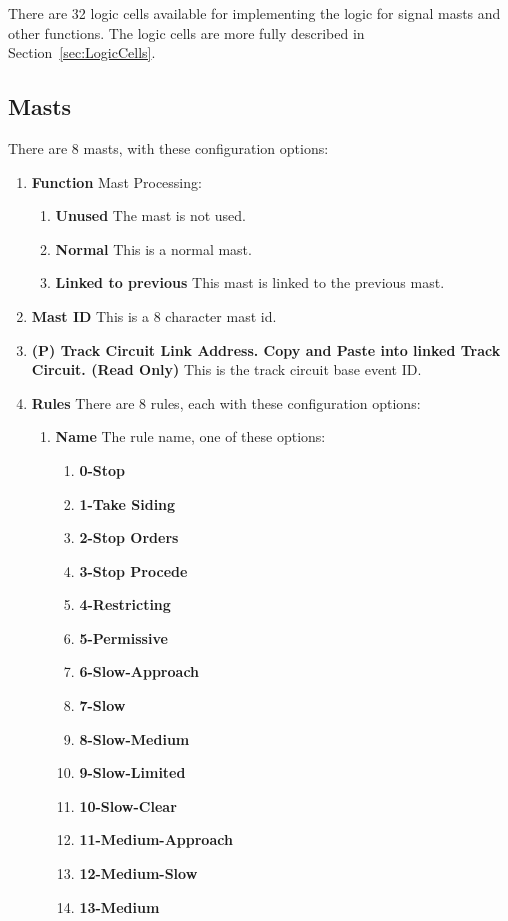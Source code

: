 There are 32 logic cells available for implementing the logic for signal masts 
and other functions.  The logic cells are more fully described in 
Section~\ref{sec:LogicCells}.

\subsection{Masts}

There are 8 masts, with these configuration options:

\begin{enumerate}
\item \textbf{Function} Mast Processing:
\begin{enumerate}
\item \textbf{Unused} The mast is not used.
\item \textbf{Normal} This is a normal mast.
\item \textbf{Linked to previous} This mast is linked to the previous mast.
\end{enumerate}
\item \textbf{Mast ID} This is a 8 character mast id.
\item \textbf{(P) Track Circuit Link Address. Copy and Paste into linked Track 
Circuit. (Read Only)} This is the track circuit base event ID.
\item \textbf{Rules} There are 8 rules, each with these configuration options:
\begin{enumerate}
\item \textbf{Name} The rule name, one of these options:
\begin{enumerate}
\item \textbf{0-Stop}
\item \textbf{1-Take Siding}
\item \textbf{2-Stop Orders}
\item \textbf{3-Stop Procede}
\item \textbf{4-Restricting}
\item \textbf{5-Permissive}
\item \textbf{6-Slow-Approach}
\item \textbf{7-Slow}
\item \textbf{8-Slow-Medium}
\item \textbf{9-Slow-Limited}
\item \textbf{10-Slow-Clear}
\item \textbf{11-Medium-Approach}
\item \textbf{12-Medium-Slow}
\item \textbf{13-Medium}

\end{enumerate}
\end{enumerate}
\end{enumerate}
